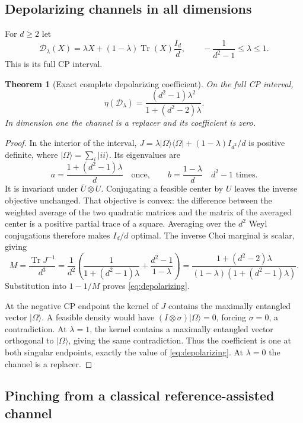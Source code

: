 \documentclass[11pt]{article}
\numberwithin{equation}{section}
\newtheorem{theorem}{Theorem}[section]
\theoremstyle{definition}
\theoremstyle{remark}
\DeclareMathOperator{\Tr}{Tr}
\newcommand{\D}{\mathcal D}
\newcommand{\ket}[1]{\lvert #1\rangle}
\newcommand{\bra}[1]{\langle #1\rvert}
\begin{document}
\subsection{Depolarizing channels in all dimensions}

For $d\geq2$ let
\[
 \D_\lambda(X)=\lambda X+(1-\lambda)\Tr(X)\frac{I_d}{d},
 \qquad -\frac1{d^2-1}\leq\lambda\leq1.
\]
This is its full CP interval.

\begin{theorem}[Exact complete depolarizing coefficient]
\label{thm:depolarizing}
On the full CP interval,
\begin{equation}
 \boxed{\qquad
 \eta(\D_\lambda)=
 \frac{(d^2-1)\lambda^2}{1+(d^2-2)\lambda}.
 \qquad}
 \label{eq:depolarizing}
\end{equation}
In dimension one the channel is a replacer and its coefficient is zero.
\end{theorem}
\begin{proof}
In the interior of the interval,
$J=\lambda\ket\Omega\bra\Omega+(1-\lambda)I_{d^2}/d$
is positive definite, where $\ket\Omega=\sum_i\ket{ii}$.
Its eigenvalues are
\[
 a=\frac{1+(d^2-1)\lambda}{d}\quad\text{once},\qquad
 b=\frac{1-\lambda}{d}\quad\text{$d^2-1$ times}.
\]
It is invariant under $\overline U\otimes U$.
Conjugating a feasible center by $U$ leaves the inverse objective
unchanged. That objective is convex: the difference between the
weighted average of the two quadratic matrices and the matrix of the
averaged center is a positive partial trace of a square.
Averaging over the $d^2$ Weyl conjugations therefore makes $I_d/d$
optimal. The inverse Choi marginal is scalar, giving
\[
 M=\frac{\Tr J^{-1}}{d^3}
 =\frac1{d^2}
 \left(\frac1{1+(d^2-1)\lambda}+\frac{d^2-1}{1-\lambda}\right)
 =\frac{1+(d^2-2)\lambda}
        {(1-\lambda)(1+(d^2-1)\lambda)} .
\]
Substitution into $1-1/M$ proves \eqref{eq:depolarizing}.

At the negative CP endpoint the kernel of $J$ contains the maximally
entangled vector $\ket\Omega$. A feasible density would have
$(I\otimes\sigma)\ket\Omega=0$, forcing $\sigma=0$, a contradiction.
At $\lambda=1$, the kernel contains a maximally entangled vector
orthogonal to $\ket\Omega$, giving the same contradiction.
Thus the coefficient is one at both singular endpoints, exactly the
value of \eqref{eq:depolarizing}. At $\lambda=0$ the channel is a
replacer.
\end{proof}

\subsection{Pinching from a classical reference-assisted channel}
\end{document}
